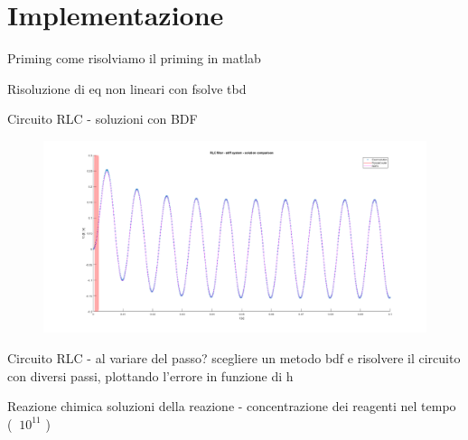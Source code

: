 \documentclass[aspectratio=169, 10pt, handout,usenames,dvipsnames]{beamer}
\begin{document}
\section{Implementazione}\label{sec:sec12}  
\begin{frame}{Priming}
come risolviamo il priming in matlab
 \end{frame}
\begin{frame}{Risoluzione di eq non lineari con fsolve}
tbd
 \end{frame}
 \begin{frame}{Circuito RLC - soluzioni con BDF}
    \begin{figure}
        \centering
        \includegraphics[width=.9\linewidth]{rlc_solution_comparison.png}
        \label{fig:my_label}
    \end{figure}
 \end{frame}
\begin{frame}{Circuito RLC - al variare del passo?}
scegliere un metodo bdf e risolvere il circuito con diversi passi, plottando l'errore in funzione di h
 \end{frame}
\begin{frame}{Reazione chimica}
soluzioni della reazione - concentrazione dei reagenti nel tempo ( $~10^{11}$ )  
 \end{frame}
\end{document}
